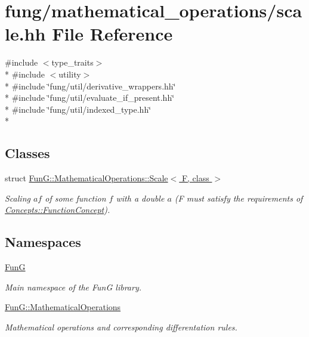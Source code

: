 \hypertarget{scale_8hh}{}\section{fung/mathematical\+\_\+operations/scale.hh File Reference}
\label{scale_8hh}
{\ttfamily \#include $<$type\+\_\+traits$>$}\\*
{\ttfamily \#include $<$utility$>$}\\*
{\ttfamily \#include \char`\"{}fung/util/derivative\+\_\+wrappers.\+hh\char`\"{}}\\*
{\ttfamily \#include \char`\"{}fung/util/evaluate\+\_\+if\+\_\+present.\+hh\char`\"{}}\\*
{\ttfamily \#include \char`\"{}fung/util/indexed\+\_\+type.\+hh\char`\"{}}\\*
\subsection*{Classes}
\begin{DoxyCompactItemize}
\item 
struct \hyperlink{structFunG_1_1MathematicalOperations_1_1Scale}{Fun\+G\+::\+Mathematical\+Operations\+::\+Scale$<$ F, class $>$}
\begin{DoxyCompactList}\small\item\em Scaling $ af $ of some function $ f $ with a double $ a $ (F must satisfy the requirements of \hyperlink{structFunG_1_1Concepts_1_1FunctionConcept}{Concepts\+::\+Function\+Concept}). \end{DoxyCompactList}\end{DoxyCompactItemize}
\subsection*{Namespaces}
\begin{DoxyCompactItemize}
\item 
 \hyperlink{namespaceFunG}{Fun\+G}
\begin{DoxyCompactList}\small\item\em Main namespace of the Fun\+G library. \end{DoxyCompactList}\item 
 \hyperlink{namespaceFunG_1_1MathematicalOperations}{Fun\+G\+::\+Mathematical\+Operations}
\begin{DoxyCompactList}\small\item\em Mathematical operations and corresponding differentation rules. \end{DoxyCompactList}\end{DoxyCompactItemize}
